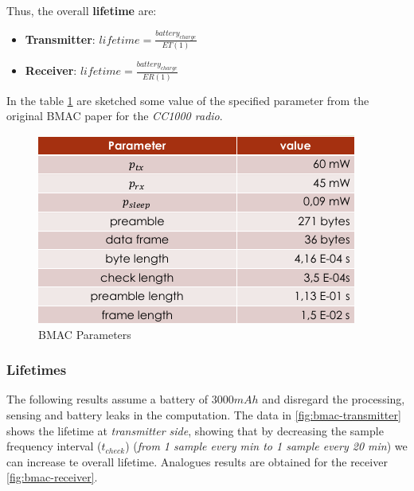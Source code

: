 \documentclass[10pt,a4paper]{report}
\theoremstyle{definition}
\begin{document}
Thus, the overall \textbf{lifetime} are:
\begin{itemize}
	\item 
	\textbf{Transmitter}: $lifetime= \frac{battery_{charge}}{ET(1)}$
	\item 
	\textbf{Receiver}: $lifetime = \frac{battery_{charge}}{ER(1)}$

	
\end{itemize}

In the table \ref{bmac-values} are sketched some value of the specified parameter from the original BMAC paper for the \textit{CC1000 radio}.
\begin{figure}[h]
	\centering\includegraphics[scale=0.50]{images/Pasted image 20230409084546.png}
	\caption{BMAC Parameters}
	\label{bmac-values}
\end{figure}

\subsubsection{Lifetimes}\label{sec:lifetime-diagrams}
The following results assume a battery of $3000 mAh$ and disregard the processing, sensing and battery leaks in the computation.
The data in \ref{fig:bmac-transmitter} shows the lifetime at \textit{transmitter side}, showing that by decreasing the sample frequency interval ($t_{check}$) (\textit{from 1 sample every min to 1 sample every 20 min}) we can increase te overall lifetime. Analogues results are obtained for the receiver \ref{fig:bmac-receiver}. 
\end{document}
